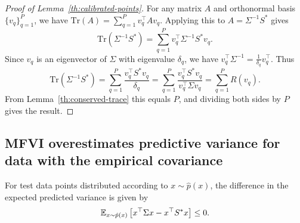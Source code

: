 \begin{proof}[Proof of Lemma~\ref{th:calibrated-points}]
For any matrix $A$ and orthonormal basis $\{v_q\}_{q=1}^P$, we have $\mathrm{Tr}(A) = \sum_{q=1}^P v_q^\top  A v_q$. Applying this to $A = \Sigma^{-1} S^*$ gives
\begin{equation}
    \mathrm{Tr}(\Sigma^{-1} S^*) = \sum_{q=1}^P v_q^\top  \Sigma^{-1} S^* v_q.
\end{equation}
Since $v_q$ is an eigenvector of $\Sigma$ with eigenvalue $\delta_q$, we have $v_q^\top  \Sigma^{-1} = \frac{1}{\delta_q} v_q^\top $. Thus
\begin{equation}
    \mathrm{Tr}(\Sigma^{-1} S^*) = \sum_{q=1}^P \frac{v_q^\top  S^* v_q}{\delta_q} = \sum_{q=1}^P \frac{v_q^\top  S^* v_q}{v_q^\top  \Sigma v_q} = \sum_{q=1}^P R(v_q).
\end{equation}
From Lemma~\ref{th:conserved-trace} this equals $P$, and dividing both sides by $P$ gives the result.
\end{proof}


\subsection{MFVI overestimates predictive variance for data with the empirical covariance}

\begin{theorem*}  
For test data points distributed according to $x\sim \hat p(x)$, the difference in the expected predicted variance is given by 
    \begin{equation}
        \mathbb{E}_{x\sim \hat p (x)}\left[x^\top \Sigma x -  x^\top S^*  x \right]  \leq 0 . 
    \end{equation}
\end{theorem*}

